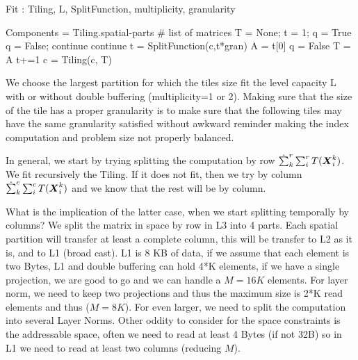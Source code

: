 \documentclass[acmsmall]{acmart}
\begin{document}
{\small
  \begin{algorithm}
    \caption{Fit : Tiling, L, SplitFunction, multiplicity, granularity }
    \label{alg:fit}
    \begin{algorithmic}
      \STATE Components = Tiling.spatial-parts    \# list of matrices 
        \STATE T  = None;  t = 1;         q = True
            \STATE q = False; continue
            \STATE continue
        \ENDIF
        \STATE t = SplitFunction(c,t*gran) 
        \STATE A = t[0]   
           \STATE q = False
        \ELSE 
           \STATE T = A
        \ENDIF
        \STATE t+=1
        \ENDWHILE
      \STATE c = Tiling(c, T) 
      \ENDWHILE
    \end{algorithmic}
  \end{algorithm}
}

We choose the largest partition for which the tiles size fit the level
capacity L with or without double buffering (multiplicity=1 or
2). Making sure that the size of the tile has a proper granularity is
to make sure that the following tiles may have the same granularity
satisfied without awkward reminder making the index computation and
problem size not properly balanced.

In general, we start by trying splitting the computation by row
$\dot\sum_k^r\sum_{i}^r T({\boldsymbol X}^{k}_{i})$. We fit recursively the
Tiling. If it does not fit, then we try by column
$\dot\sum_k^c\sum_{i}^c T({\boldsymbol X}^{k}_{i})$ and we know that the rest
will be by column.


What is the implication of the latter case, when we start splitting
temporally by columns? We split the matrix in space by row in L3 into
4 parts. Each spatial partition will transfer at least a complete
column, this will be transfer to L2 as it is, and to L1 (broad cast).
L1 is 8 KB of data, if we assume that each element is two Bytes, L1
and double buffering can hold 4*K elements, if we have a single
projection, we are good to go and we can handle a $M=16K$ elements.
For layer norm, we need to keep two projections and thus the maximum
size is 2*K read elements and thus ($M = 8K$). For even larger, we
need to split the computation into several Layer Norms.  Other oddity
to consider for the space constraints is the addressable space, often
we need to read at least 4 Bytes (if not 32B) so in L1 we need to read
at least two columns (reducing $M$).
\end{document}
